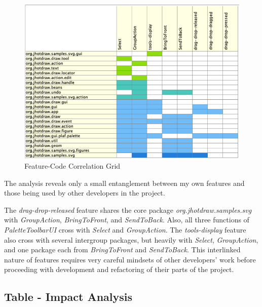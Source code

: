 \begin{figure}[H]
    \centering
    \includegraphics[width=\linewidth]{pic/Feature-Code Correlation Grid.png}
    \caption{Feature-Code Correlation Grid}
    \label{fig:Feature-Code Correlation Grid}
\end{figure}

The analysis reveals only a small entanglement between my own features and those being used by other developers in the project.

The \textit{drag-drop-released} feature shares the core package \textit{org.jhotdraw.samples.svg}
with \textit{GroupAction}, \textit{BringToFront}, and \textit{SendToBack}.
Also, all three functions of \textit{PaletteToolbarUI} cross with \textit{Select} and \textit{GroupAction}.
The \textit{tools-display} feature also cross with several intergroup packages,
but heavily with \textit{Select}, \textit{GroupAction}, and one package each from \textit{BringToFront} and \textit{SendToBack}.
This interlinked nature of features requires very careful mindsets of other developers' work before proceeding with development and refactoring of
their parts of the project.

\subsection{Table - Impact Analysis}


